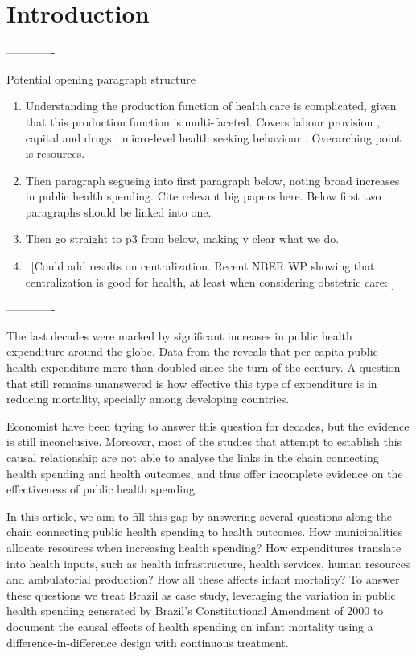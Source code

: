 \section{Introduction}\label{sec:intro}
\setcounter{page}{1}


-------------

Potential opening paragraph structure
\begin{enumerate}
    \item Understanding the production function of health care is complicated, given that this production function is multi-faceted. Covers labour provision \citep{Custeretal1990}, capital and drugs \citep{Austeretal1969}, micro-level health seeking behaviour \citep{LlerasMuney2005}.  Overarching point is resources.
    \item Then paragraph segueing into first paragraph below, noting broad increases in public health spending.  Cite relevant big papers here.  Below first two paragraphs should be linked into one.
    \item Then go straight to p3 from below, making v clear what we do.
    \item \ [Could add results on centralization.  Recent NBER WP showing that centralization is good for health, at least when considering obstetric care: \citet{Fischeretal2022}]
\end{enumerate}
-------------

The last decades were marked by significant increases in public health expenditure around the globe. Data from the \cite{wb} reveals that per capita public health expenditure more than doubled since the turn of the century. A question that still remains unanswered is how effective this type of expenditure is in reducing mortality, specially among developing countries. 

Economist have been trying to answer this question for decades, but the evidence is still inconclusive. Moreover, most of the studies that attempt to establish this causal relationship are not able to analyse the links in the chain connecting health spending and health outcomes, and thus offer incomplete evidence on the effectiveness of public health spending.  

In this article, we aim to fill this gap by answering several questions along the chain connecting public health spending to health outcomes. How municipalities allocate resources when increasing health spending? How expenditures translate into health inputs, such as health infrastructure, health services, human resources and ambulatorial production? How all these affects infant mortality? To answer these questions we treat Brazil as case study, leveraging the variation in public health spending generated by Brazil's  Constitutional Amendment of 2000 to document the causal effects of health spending on infant mortality using a difference-in-difference design with continuous treatment.

